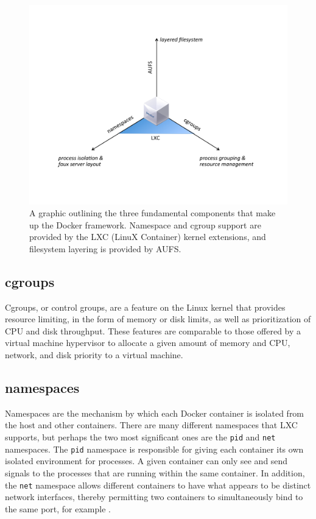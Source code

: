 \begin{figure}[h]
\centering
    \includegraphics[width=1.0\textwidth]{docker.pdf}
    \caption{A graphic outlining the three fundamental components that make up the Docker framework. Namespace and cgroup support are provided by the LXC (LinuX Container) kernel extensions, and filesystem layering is provided by AUFS.}
\end{figure}

\subsection{cgroups}
Cgroups, or control groups, are a feature on the Linux kernel that provides resource limiting, in the form of memory or disk limits, as well as prioritization of CPU and disk throughput. These features are comparable to those offered by a virtual machine hypervisor to allocate a given amount of memory and CPU, network, and disk priority to a virtual machine.

\subsection{namespaces}

Namespaces are the mechanism by which each Docker container is isolated from the host and other containers. There are many different namespaces that LXC supports, but perhaps the two most significant ones are the \texttt{pid} and \texttt{net} namespaces. The \texttt{pid} namespace is responsible for giving each container its own isolated environment for processes. A given container can only see and send signals to the processes that are running within the same container. In addition, the \texttt{net} namespace allows different containers to have what appears to be distinct network interfaces, thereby permitting two containers to simultaneously bind to the same port, for example \cite{lxc}.

